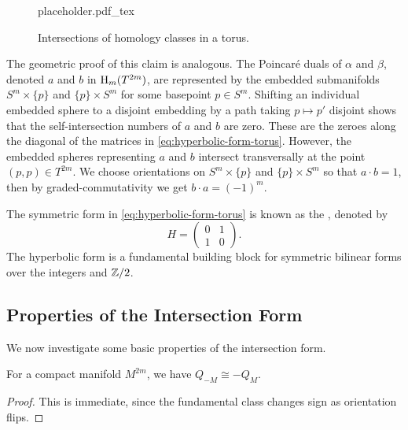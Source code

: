 \begin{figure}[ht]
	\centering
	{placeholder.pdf_tex}
	\caption{Intersections of homology classes in a torus.}\label{fig:geometric-intersection-torus} 
\end{figure}

The geometric proof of this claim is analogous. The Poincar\'e duals of $\alpha$ and $\beta$, denoted $a$ and $b$ in $\operatorname{H}_{m}(T^{2m})$, are represented
by the embedded submanifolds $S^m\times \{p\}$ and $\{p\}\times S^m$ for some basepoint $p\in S^m$. Shifting an individual embedded sphere to a disjoint embedding by a path taking $p\mapsto p'$ disjoint shows that the self-intersection numbers of $a$ and $b$ are zero. These are the zeroes along the diagonal of the matrices in \cref{eq:hyperbolic-form-torus}. However, the embedded spheres representing $a$ and $b$ intersect transversally at the point $(p,p)\in T^{2m}$. We choose orientations on $S^m\times \{p\}$ and $\{p\}\times S^m$ so that $a\cdot b=1$, then by graded-commutativity we get $b\cdot a=(-1)^m$.

\begin{remark}
	The symmetric form in \cref{eq:hyperbolic-form-torus} is known as the , denoted by
	\[
		H=\begin{pmatrix} 0 & 1\\ 1 & 0 \end{pmatrix}.
	\]
	The hyperbolic form is a fundamental building block for symmetric bilinear forms over the integers and $\mathbb{Z}/2$.
\end{remark}

\subsection{Properties of the Intersection Form}
We now investigate some basic properties of the intersection form.

\begin{proposition}\label{prop:orientation-intersection-form}
	For a compact manifold $M^{2m}$, we have
	$Q_{-M} \cong -Q_{M}$.
\end{proposition}
\begin{proof}
	This is immediate, since the fundamental class changes sign as orientation flips.
\end{proof}

